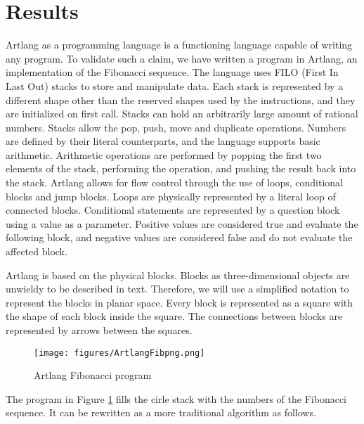 
\section{Results}
\label{sec:results}

Artlang as a programming language is a functioning language capable of writing any program.
To validate such a claim, we have written a program in Artlang, an implementation of the Fibonacci sequence.
The language uses FILO (First In Last Out) stacks to store and manipulate data. Each stack is represented by a different shape other than the reserved shapes used by the instructions, and they are initialized on first call.
Stacks can hold an arbitrarily large amount of rational numbers.
Stacks allow the pop, push, move and duplicate operations.
Numbers are defined by their literal counterparts, and the language supports basic arithmetic.
Arithmetic operations are performed by popping the first two elements of the stack, performing the operation, and pushing the result back into the stack.
Artlang allows for flow control through the use of loops, conditional blocks and jump blocks.
Loops are physically represented by a literal loop of connected blocks.
Conditional statements are represented by a question block using a value as a parameter. Positive values are considered true and evaluate the following block, and negative values are considered false and do not evaluate the affected block.


Artlang is based on the physical blocks. Blocks as three-dimensional objects are unwieldy to be described in text.
Therefore, we will use a simplified notation to represent the blocks in planar space.
Every block is represented as a square with the shape of each block inside the square. 
The connections between blocks are represented by arrows between the squares.

\begin{figure}[H]
    \centering
    \texttt{[image: figures/ArtlangFibpng.png]}
    \caption{Artlang Fibonacci program}
    \vspace{5pt}
    \label{fig:artlangfib}
\end{figure}

The program in Figure \ref{fig:artlangfib} fills the cirle stack with the numbers of the Fibonacci sequence.
It can be rewritten as a more traditional algorithm as follows.

